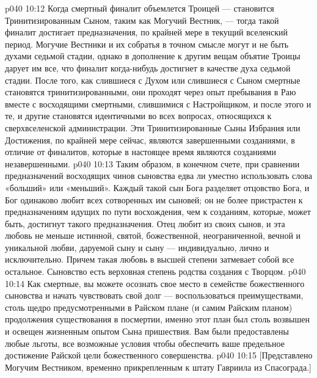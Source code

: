 \vs p040 10:12 Когда смертный финалит объемлется Троицей --- становится Тринитизированным Сыном, таким как Могучий Вестник, --- тогда такой финалит достигает предназначения, по крайней мере в текущий вселенский период. Могучие Вестники и их собратья в точном смысле могут и не быть духами седьмой стадии, однако в дополнение к другим вещам объятие Троицы дарует им все, что финалит когда\hyp{}нибудь достигнет в качестве духа седьмой стадии. После того, как слившиеся с Духом или слившиеся с Сыном смертные становятся тринитизированными, они проходят через опыт пребывания в Раю вместе с восходящими смертными, слившимися с Настройщиком, и после этого и те, и другие становятся идентичными во всех вопросах, относящихся к сверхвселенской администрации. Эти Тринитизированные Сыны Избрания или Достижения, по крайней мере сейчас, являются завершенными созданиями, в отличие от финалитов, которые в настоящее время являются созданиями незавершенными.
\vs p040 10:13 \pc Таким образом, в конечном счете, при сравнении предназначений восходящих чинов сыновства едва ли уместно использовать слова «больший» или «меньший». Каждый такой сын Бога разделяет отцовство Бога, и Бог одинаково любит всех сотворенных им сыновей; он не более пристрастен к предназначениям идущих по пути восхождения, чем к созданиям, которые, может быть, достигнут такого предназначения. Отец любит  из своих сынов, и эта любовь не меньше истинной, святой, божественной, неограниченной, вечной и уникальной любви, даруемой  сыну и  сыну --- индивидуально, лично и исключительно. Причем такая любовь в высшей степени затмевает собой все остальное. Сыновство есть верховная степень родства создания с Творцом.
\vs p040 10:14 Как смертные, вы можете осознать свое место в семействе божественного сыновства и начать чувствовать свой долг --- воспользоваться преимуществами, столь щедро предусмотренными в Райском плане (и самим Райским планом) продолжения существования в посмертии, именно этот план был столь возвышен и освещен жизненным опытом Сына пришествия. Вам были предоставлены любые льготы, все возможные условия чтобы обеспечить ваше предельное достижение Райской цели божественного совершенства.
\vsetoff
\vs p040 10:15 [Представлено Могучим Вестником, временно прикрепленным к штату Гавриила из Спасограда.]
